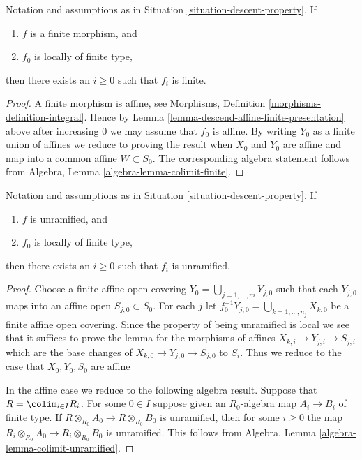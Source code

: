 \begin{lemma}
\label{lemma-descend-finite-finite-presentation}
Notation and assumptions as in Situation \ref{situation-descent-property}.
If
\begin{enumerate}
\item $f$ is a finite morphism, and
\item $f_0$ is locally of finite type,
\end{enumerate}
then there exists an $i \geq 0$ such that $f_i$ is finite.
\end{lemma}

\begin{proof}
A finite morphism is affine, see
Morphisms, Definition \ref{morphisms-definition-integral}.
Hence by Lemma \ref{lemma-descend-affine-finite-presentation} above
after increasing $0$ we may assume that $f_0$ is affine.
By writing $Y_0$ as a finite union of affines we reduce to proving
the result when $X_0$ and $Y_0$ are affine and map
into a common affine $W \subset S_0$. The corresponding algebra
statement follows from Algebra, Lemma \ref{algebra-lemma-colimit-finite}.
\end{proof}

\begin{lemma}
\label{lemma-descend-unramified}
Notation and assumptions as in Situation \ref{situation-descent-property}.
If
\begin{enumerate}
\item $f$ is unramified, and
\item $f_0$ is locally of finite type,
\end{enumerate}
then there exists an $i \geq 0$ such that $f_i$ is unramified.
\end{lemma}

\begin{proof}
Choose a finite affine open covering
$Y_0 = \bigcup_{j = 1, \ldots, m} Y_{j, 0}$
such that each $Y_{j, 0}$ maps into an affine open
$S_{j, 0} \subset S_0$. For each $j$ let
$f_0^{-1}Y_{j, 0} = \bigcup_{k = 1, \ldots, n_j} X_{k, 0}$ be a
finite affine open covering. Since the property of being unramified is
local we see that it suffices to prove the lemma for the morphisms
of affines $X_{k, i} \to Y_{j, i} \to S_{j, i}$ which are the base
changes of $X_{k, 0} \to Y_{j, 0} \to S_{j, 0}$ to $S_i$.
Thus we reduce to the case that $X_0, Y_0, S_0$ are affine

\medskip\noindent
In the affine case we reduce to the following algebra result.
Suppose that $R = \colim_{i \in I} R_i$. For some $0 \in I$
suppose given an $R_0$-algebra map $A_i \to B_i$ of finite type.
If $R \otimes_{R_0} A_0 \to R \otimes_{R_0} B_0$ is unramified, then
for some $i \geq 0$ the map
$R_i \otimes_{R_0} A_0 \to R_i \otimes_{R_0} B_0$ is unramified.
This follows from Algebra,
Lemma \ref{algebra-lemma-colimit-unramified}.
\end{proof}

